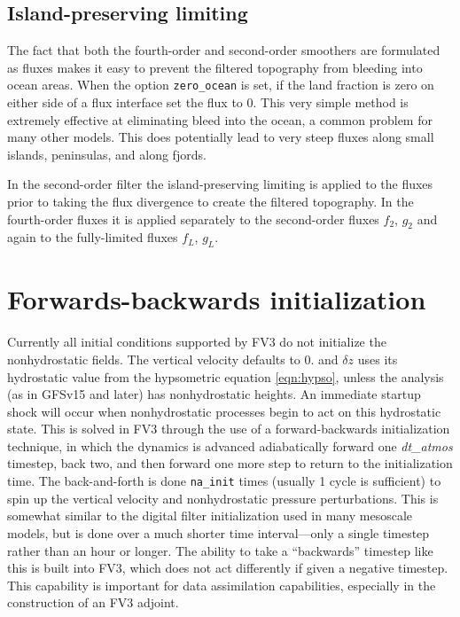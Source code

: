 \documentclass[10pt,letterpaper,margin=1in]{memoir}
\begin{document}
\subsection{Island-preserving limiting}

The fact that both the fourth-order and second-order smoothers are formulated as fluxes makes it easy to prevent the filtered topography from bleeding into ocean areas. When the option \texttt{{zero_ocean}} is set, if the land fraction is zero on either side of a flux interface set the flux to 0. This very simple method is extremely effective at eliminating bleed into the ocean, a common problem for many other models. This does potentially lead to very steep fluxes along small islands, peninsulas, and along fjords. 

In the second-order filter the island-preserving limiting is applied to the fluxes prior to taking the flux divergence to create the filtered topography. In the fourth-order fluxes it is applied separately to the second-order fluxes $f_2$, $g_2$ and again to the fully-limited fluxes $f_L$, $g_L$. 

\section{Forwards-backwards initialization}

Currently all initial conditions supported by FV3 do not initialize the nonhydrostatic fields. The vertical velocity defaults to 0. and $\delta z$ uses its hydrostatic value from the hypsometric equation \eqref{eqn:hypso}, unless the analysis (as in GFSv15 and later) has nonhydrostatic heights. An immediate startup shock will occur when nonhydrostatic processes begin to act on this hydrostatic state. This is solved in FV3 through the use of a forward-backwards initialization technique, in which the dynamics is advanced adiabatically forward one \textit{dt_atmos} timestep, back two, and then forward one more step to return to the initialization time. The back-and-forth is done \texttt{na_init} times (usually 1 cycle is sufficient) to spin up the vertical velocity and nonhydrostatic pressure perturbations.  This is somewhat similar to the digital filter initialization \citep{huang2002new} used in many mesoscale models, but is done over a much shorter time interval---only a single timestep rather than an hour or longer. The ability to take a ``backwards'' timestep like this is built into FV3, which does not act differently if given a negative timestep. This capability is important for data assimilation capabilities, especially in the construction of an FV3 adjoint.
\end{document}
